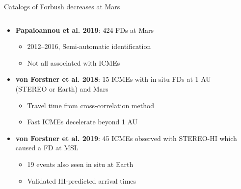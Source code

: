 \documentclass[10pt,aspectratio=169,usenames,dvipsnames]{beamer}
\begin{document}
\begin{frame}{Catalogs of Forbush decreases at Mars}
    \begin{columns}
    	\begin{column}{0.55\textwidth}
    		\begin{itemize}
                \item<1-> \textbf{Papaioannou et al. 2019}: 424 FDs at Mars
                    \begin{itemize}
                        \item 2012--2016, Semi-automatic identification
                        \item Not all associated with ICMEs
                    \end{itemize}
                \item<2-> \textbf{von Forstner et al. 2018}: 15 ICMEs with in situ FDs at 1 AU (STEREO or Earth) and Mars
                    \begin{itemize}
                        \item Travel time from cross-correlation method
                        \item Fast ICMEs decelerate beyond 1 AU
                    \end{itemize}
    			\item<3-> \textbf{von Forstner et al. 2019}: 45 ICMEs observed with STEREO-HI which caused a FD at MSL
    				\begin{itemize}
    					\item 19 events also seen in situ at Earth
                        \item Validated HI-predicted arrival times
    				\end{itemize}
    		\end{itemize}
    	\end{column}
    	\begin{column}{0.35\textwidth}
            \centering
\end{column}
\end{columns}
\end{frame}
\end{document}
